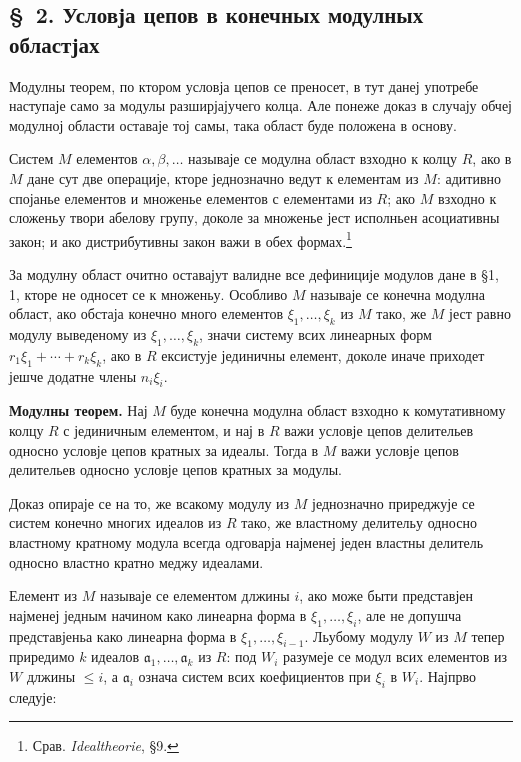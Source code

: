 ﻿\documentclass[11pt]{article}
\begin{document}
\setcounter{footnote}{11}

\subsection*{\S~2. Условја цепов в конечных модулных областјах}

Модулны теорем, по ктором условја цепов се преносет, в тут данеј употребе наступаје само за модулы разширјајучего колца. Але понеже доказ в случају обчеј модулној области оставаје тој самы, така област буде положена в основу.

Систем $M$ елементов $\alpha,\beta,\ldots$ называје се модулна област взходно к колцу $R$, ако в $M$ дане сут две операције, кторе једнозначно ведут к елементам из $M$: адитивно спојанье елементов и множенье елементов с елементами из $R$; ако $M$ взходно к сложеньу твори абелову групу, доколе за множенье јест исполньен асоциативны закон; и ако дистрибутивны закон важи в обех формах.\footnote{Срав. \emph{Idealtheorie}, §9.}

За модулну област очитно оставајут валидне все дефиниције модулов дане в §1, 1, кторе не односет се к множеньу. Особливо $M$ называје се конечна модулна област, ако обстаја конечно много елементов $\xi_1,\ldots,\xi_k$ из $M$ тако, же $M$ јест равно модулу выведеному из $\xi_1,\ldots,\xi_k$, значи систему всих линеарных форм $r_1\xi_1+\cdots+r_k\xi_k$, ако в $R$ ексистује јединичны елемент, доколе иначе приходет јешче додатне члены $n_i\xi_i$.

\medskip
\noindent\textbf{Модулны теорем.} Нај $M$ буде конечна модулна област взходно к комутативному колцу $R$ с јединичным елементом, и нај в $R$ важи условје цепов делительев односно условје цепов кратных за идеалы. Тогда в $M$ важи условје цепов делительев односно условје цепов кратных за модулы.

Доказ опираје се на то, же всакому модулу из $M$ једнозначно приреджује се систем конечно многих идеалов из $R$ тако, же властному делительу односно властному кратному модула всегда одговарја најменеј једен властны делитель односно властно кратно меджу идеалами.

Елемент из $M$ называје се елементом длжины $i$, ако може быти представјен најменеј једным начином како линеарна форма в $\xi_1,\ldots,\xi_i$, але не допушча представјеньа како линеарна форма в $\xi_1,\ldots,\xi_{i-1}$. Льубому модулу $W$ из $M$ тепер приредимо $k$ идеалов $\mathfrak a_1,\ldots,\mathfrak a_k$ из $R$: под $W_i$ разумеје се модул всих елементов из $W$ длжины $\le i$, а $\mathfrak a_i$ означа систем всих коефициентов при $\xi_i$ в $W_i$. Најпрво следује:
\end{document}
